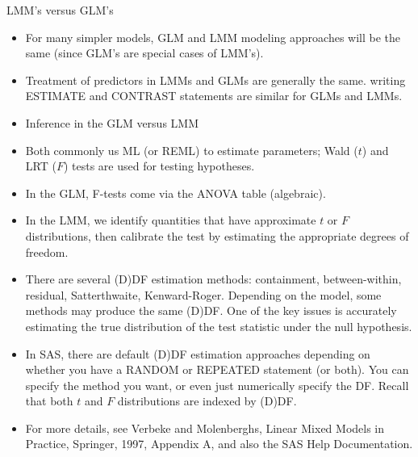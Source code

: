 \documentclass[
  9pt,
  ignorenonframetext,
]{beamer}
\begin{document}
\begin{frame}{LMM's versus GLM's}
\protect\hypertarget{lmms-versus-glms}{}
\begin{itemize}
\item
  For many simpler models, GLM and LMM modeling approaches will be the
  same (since GLM's are special cases of LMM's).
\item
  Treatment of predictors in LMMs and GLMs are generally the same.
  writing ESTIMATE and CONTRAST statements are similar for GLMs and
  LMMs.
\item
  Inference in the GLM versus LMM
\item
  Both commonly us ML (or REML) to estimate parameters; Wald (\(t\)) and
  LRT (\(F\)) tests are used for testing hypotheses.
\item
  In the GLM, F-tests come via the ANOVA table (algebraic).
\item
  In the LMM, we identify quantities that have approximate \(t\) or
  \(F\) distributions, then calibrate the test by estimating the
  appropriate degrees of freedom.
\end{itemize}
\end{frame}

\begin{frame}{}
\protect\hypertarget{section-6}{}
\begin{itemize}
\item
  There are several (D)DF estimation methods: containment,
  between-within, residual, Satterthwaite, Kenward-Roger. Depending on
  the model, some methods may produce the same (D)DF. One of the key
  issues is accurately estimating the true distribution of the test
  statistic under the null hypothesis.
\item
  In SAS, there are default (D)DF estimation approaches depending on
  whether you have a RANDOM or REPEATED statement (or both). You can
  specify the method you want, or even just numerically specify the DF.
  Recall that both \(t\) and \(F\) distributions are indexed by (D)DF.
\item
  For more details, see Verbeke and Molenberghs, Linear Mixed Models in
  Practice, Springer, 1997, Appendix A, and also the SAS Help
  Documentation.
\end{itemize}
\end{frame}
\end{document}
